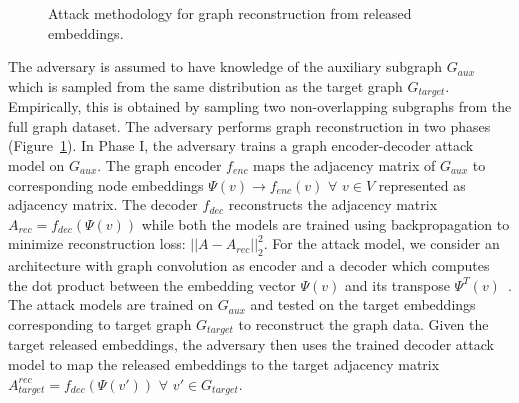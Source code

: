 \begin{figure}[!htb]
    \centering
    \begin{minipage}[b]{1\linewidth}
    \centering


    \end{minipage}
\vspace{-2mm}
    \caption{Attack methodology for graph reconstruction from released embeddings.}
    \label{fig:recattack}
\vspace{-1mm}
\end{figure}


The adversary is assumed to have knowledge of the auxiliary subgraph $G_{aux}$ which is sampled from the same distribution as the target graph $G_{target}$.
Empirically, this is obtained by sampling two non-overlapping subgraphs from the full graph dataset.
The adversary performs graph reconstruction in two phases (Figure~\ref{fig:recattack}).
In Phase I, the adversary trains a graph encoder-decoder attack model on $G_{aux}$.
The graph encoder $f_{enc}$ maps the adjacency matrix of $G_{aux}$ to corresponding node embeddings $\Psi (v)\rightarrow f_{enc}(v)$ $\forall$ $v \in V$ represented as adjacency matrix.
The decoder $f_{dec}$ reconstructs the adjacency matrix $A_{rec} = f_{dec}(\Psi (v))$ while both the models are trained using backpropagation to minimize reconstruction loss: $||A - A_{rec}||_2^2$.
For the attack model, we consider an architecture with graph convolution as encoder and a decoder which computes the dot product between the embedding vector $\Psi (v)$ and its transpose $\Psi^T (v)$~\cite{Kipf2016tc}.
The attack models are trained on $G_{aux}$ and tested on the target embeddings corresponding to target graph $G_{target}$ to reconstruct the graph data.
Given the target released embeddings, the adversary then uses the trained decoder attack model to map the released embeddings to the target adjacency matrix $A_{target}^{rec} = f_{dec}(\Psi (v'))$ $\forall$ $v'\in G_{target}$.\\



